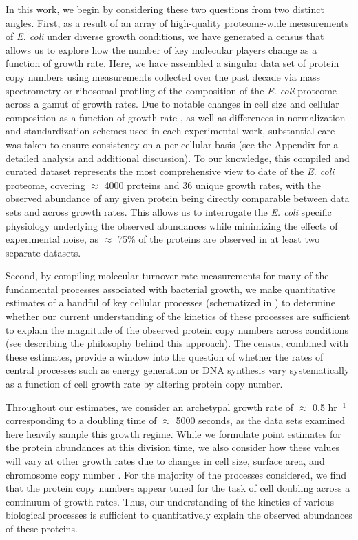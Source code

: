 In this work, we begin by considering these two questions from two distinct
angles. First, as a result of an array of high-quality proteome-wide
measurements of \textit{E. coli} under diverse growth conditions, we have
generated a census that allows us to explore how the number of key molecular
players change as a function of growth rate. Here, we have assembled a singular
data set of protein copy numbers using measurements collected over the past
decade via mass spectrometry \citep{schmidt2016, peebo2015, valgepea2013} or
ribosomal profiling \citep{li2014} of the composition of the \textit{E. coli}
proteome across a gamut of growth rates. Due to notable changes in cell size and
cellular composition as a function of growth rate \citep{bremer2008,
taheriaraghi2015}, as well as differences in normalization and standardization
schemes used in each experimental work, substantial care was taken to ensure
consistency on a per cellular basis (see the Appendix for a detailed analysis
and additional discussion). To our knowledge, this compiled and curated dataset
represents the most comprehensive view to date of the \textit{E. coli} proteome,
covering $\approx$ 4000 proteins and 36 unique growth rates, with the observed
abundance of any given protein being directly comparable between data sets and
across growth rates. This allows us to interrogate  the \textit{E. coli}
specific physiology underlying the observed abundances while  minimizing the
effects of experimental noise, as  $\approx$ 75\% of the  proteins are observed
in at least two separate datasets.

Second, by compiling molecular turnover rate measurements for many of the
fundamental processes associated with bacterial growth, we make quantitative
estimates of a handful of key cellular processes (schematized in
) to determine whether our current understanding of the
kinetics of these processes are sufficient to explain the magnitude of the
observed protein copy numbers across conditions (see 
describing the philosophy behind this approach). The census, combined with
these estimates, provide a window into the question of whether the rates of
central processes such as energy generation or DNA synthesis vary
systematically as a function of cell growth rate by altering protein copy
number.

Throughout our estimates, we consider an archetypal growth rate of $\approx$
0.5 hr$^{-1}$ corresponding to a doubling time of $\approx$ 5000 seconds, as
the data sets examined here heavily sample this growth regime. While we
formulate point estimates for the protein abundances at this division time,
we also consider how these values will vary at other growth rates due to
changes in cell size, surface area, and chromosome copy number
\citep{taheriaraghi2015, harris2018}. For the majority of the processes
considered, we find that the protein copy numbers appear tuned for the task
of cell doubling across a continuum of growth rates. Thus, our understanding
of the kinetics of various biological processes is sufficient to
quantitatively explain the observed abundances of these proteins.

